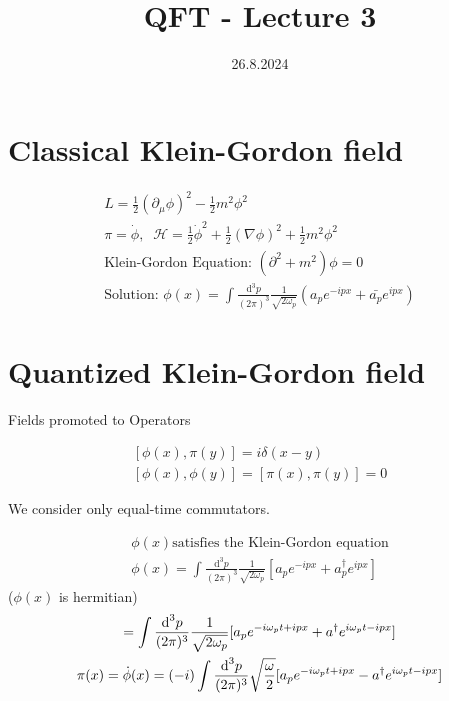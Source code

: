 \documentclass[]{scrartcl}
\title{QFT - Lecture 3}
\author{}
\date{26.8.2024}
\begin{document}
\maketitle
\newpage
\tableofcontents
\newpage

\section{Classical Klein-Gordon field} 

\begin{gather}
	L = \frac{1}{2}(\partial_\mu\phi)^2 - \frac{1}{2}m^2\phi^2\\
	\pi = \dot\phi, \;\; \mathcal{H} = \frac{1}{2}\dot\phi^2 + \frac{1}{2}(\nabla\phi)^2 + \frac{1}{2}m^2\phi^2\\
	\text{Klein-Gordon Equation: } (\partial^2 + m^2)\phi = 0\\
	\text{Solution: } \phi(x) = \int \frac{\text{d}^3p}{(2\pi)^3} \frac{1}{\sqrt{2\omega_p}}\left(a_p e^{-ipx} + \bar{a_p}e^{ipx}\right)
\end{gather}

\section{Quantized Klein-Gordon field}
Fields promoted to Operators

\begin{gather}
	\left[\phi(x), \pi(y)\right] = i\delta(x-y)\\
	\left[\phi(x), \phi(y)\right] = [\pi(x),\pi(y)] = 0
\end{gather}

We consider only equal-time commutators.

\begin{gather}
	\phi(x) \text{satisfies the Klein-Gordon equation}\\
	\phi(x) = \int\frac{\text{d}^3p}{(2\pi)^3}\frac{1}{\sqrt{2\omega_p}}\left[a_p e^{-ipx} + a_p^\dagger e^{ipx}\right]
\end{gather}
($\phi(x)$ is hermitian)
\begin{gather}
	= \int\frac{\text{d}^3 p}{(2\pi)^3}\frac{1}{\sqrt{2\omega_p}}[a_p e^{-i\omega_p t + ipx} + a^\dagger e^{i\omega_p t - ipx}]\\
	\pi(x) = \dot\phi(x) = (-i)\int\frac{\text d^3p}{(2\pi)^3}\sqrt{\frac{\omega}{2}}[a_p e^{-i\omega_p t + ipx} - a^\dagger e^{i\omega_p t - ipx}]
\end{gather}
\end{document}
